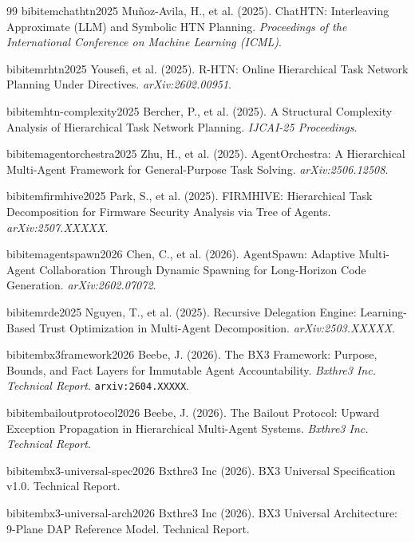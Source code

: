 \begin{thebibliography}{99}
bibitem{chathtn2025}
Mu\~noz-Avila, H., et al. (2025). ChatHTN: Interleaving Approximate (LLM) and Symbolic HTN Planning. \textit{Proceedings of the International Conference on Machine Learning (ICML)}.

bibitem{rhtn2025}
Yousefi, et al. (2025). R-HTN: Online Hierarchical Task Network Planning Under Directives. \textit{arXiv:2602.00951}.

bibitem{htn-complexity2025}
Bercher, P., et al. (2025). A Structural Complexity Analysis of Hierarchical Task Network Planning. \textit{IJCAI-25 Proceedings}.

bibitem{agentorchestra2025}
Zhu, H., et al. (2025). AgentOrchestra: A Hierarchical Multi-Agent Framework for General-Purpose Task Solving. \textit{arXiv:2506.12508}.

bibitem{firmhive2025}
Park, S., et al. (2025). FIRMHIVE: Hierarchical Task Decomposition for Firmware Security Analysis via Tree of Agents. \textit{arXiv:2507.XXXXX}.

bibitem{agentspawn2026}
Chen, C., et al. (2026). AgentSpawn: Adaptive Multi-Agent Collaboration Through Dynamic Spawning for Long-Horizon Code Generation. \textit{arXiv:2602.07072}.

bibitem{rde2025}
Nguyen, T., et al. (2025). Recursive Delegation Engine: Learning-Based Trust Optimization in Multi-Agent Decomposition. \textit{arXiv:2503.XXXXX}.

bibitem{bx3framework2026}
Beebe, J. (2026). The BX3 Framework: Purpose, Bounds, and Fact Layers for Immutable Agent Accountability. \textit{Bxthre3 Inc. Technical Report}. \texttt{arxiv:2604.XXXXX}.

bibitem{bailoutprotocol2026}
Beebe, J. (2026). The Bailout Protocol: Upward Exception Propagation in Hierarchical Multi-Agent Systems. \textit{Bxthre3 Inc. Technical Report}.

bibitem{bx3-universal-spec2026}
Bxthre3 Inc (2026). BX3 Universal Specification v1.0. Technical Report.

bibitem{bx3-universal-arch2026}
Bxthre3 Inc (2026). BX3 Universal Architecture: 9-Plane DAP Reference Model. Technical Report.

\end{thebibliography}